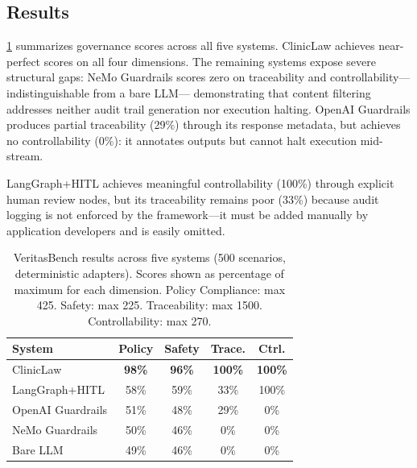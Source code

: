 \documentclass{article}
\begin{document}
\subsection{Results}

\cref{tab:results} summarizes governance scores across all five systems.
ClinicLaw achieves near-perfect scores on all four dimensions. The remaining
systems expose severe structural gaps: NeMo Guardrails scores zero on
traceability and controllability---indistinguishable from a bare LLM---
demonstrating that content filtering addresses neither audit trail generation
nor execution halting. OpenAI Guardrails produces partial traceability (29\%)
through its response metadata, but achieves no controllability (0\%): it
annotates outputs but cannot halt execution mid-stream.

LangGraph+HITL achieves meaningful controllability (100\%) through explicit
human review nodes, but its traceability remains poor (33\%) because audit
logging is not enforced by the framework---it must be added manually by
application developers and is easily omitted.

\begin{table}[t]
  \caption{VeritasBench results across five systems (500 scenarios,
    deterministic adapters). Scores shown as percentage of maximum for each
    dimension. Policy Compliance: max 425. Safety: max 225. Traceability:
    max 1500. Controllability: max 270.}
  \label{tab:results}
  \begin{center}
  \begin{small}
  \begin{tabular}{lcccc}
    \toprule
    \textbf{System} & \textbf{Policy} & \textbf{Safety} &
    \textbf{Trace.} & \textbf{Ctrl.} \\
    \midrule
    ClinicLaw          & \textbf{98\%} & \textbf{96\%} & \textbf{100\%} & \textbf{100\%} \\
    LangGraph+HITL     & 58\%          & 59\%          & 33\%           & 100\% \\
    OpenAI Guardrails  & 51\%          & 48\%          & 29\%           & 0\%   \\
    NeMo Guardrails    & 50\%          & 46\%          & 0\%            & 0\%   \\
    Bare LLM           & 49\%          & 46\%          & 0\%            & 0\%   \\
    \bottomrule
  \end{tabular}
  \end{small}
  \end{center}
  \vskip -0.1in
\end{table}
\end{document}
